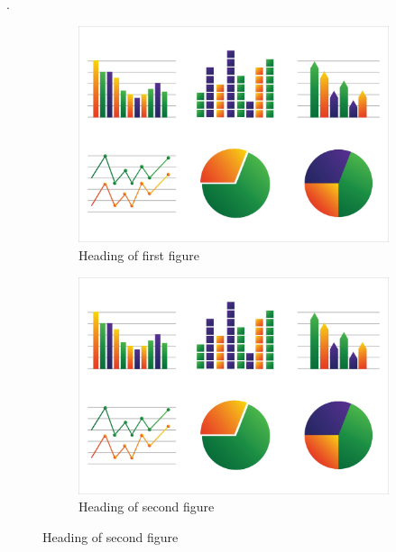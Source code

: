 \documentclass[12pt]{../bppaper}
\begin{document}
\blindtext \cite{latex2e}.
\begin{figure}[t]
\centering
\caption{Main heading of the figure, with \texttt{[t]}}
\begin{subfigure}{0.48\textwidth}
\caption{Heading of first figure}
\includegraphics[width=1\linewidth]{graph}
\end{subfigure}
\begin{subfigure}{0.48\textwidth}
\caption{Heading of second figure}
\includegraphics[width=1\linewidth]{graph}
\end{subfigure}
\end{figure}
\blindtext

\clearpage



\clearpage
\end{document}
